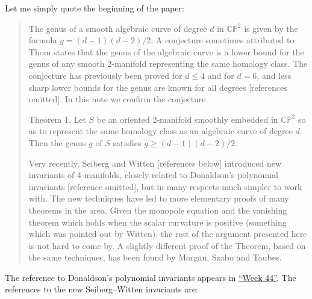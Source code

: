 \documentclass{article}
\renewcommand{\texttt}[1]{%
  \begingroup
  \ttfamily
  \begingroup\lccode`~=`/\lowercase{\endgroup\def~}{/\discretionary{}{}{}}%
  \begingroup\lccode`~=`[\lowercase{\endgroup\def~}{[\discretionary{}{}{}}%
  \begingroup\lccode`~=`.\lowercase{\endgroup\def~}{.\discretionary{}{}{}}%
  \catcode`/=\active\catcode`[=\active\catcode`.=\active
  \scantokens{#1\noexpand}%
  \endgroup
}
\begin{document}
Let me simply quote the beginning of the paper:

\begin{quote}
The genus of a smooth algebraic curve of degree \(d\) in
\(\mathbb{CP}^2\) is given by the formula \(g = (d-1)(d-2)/2\). A
conjecture sometimes attributed to Thom states that the genus of the
algebraic curve is a lower bound for the genus of any smooth 2-manifold
representing the same homology class. The conjecture has previously been
proved for \(d \leqslant 4\) and for \(d = 6\), and less sharp lower
bounds for the genus are known for all degrees {[}references omitted{]}.
In this note we confirm the conjecture.

Theorem 1. Let \(S\) be an oriented 2-manifold smoothly embedded in
\(\mathbb{CP}^2\) so as to represent the same homology class as an
algebraic curve of degree \(d\). Then the genus \(g\) of \(S\) satisfies
\(g \geqslant (d-1)(d-2)/2\).

Very recently, Seiberg and Witten {[}references below{]} introduced new
invariants of 4-manifolds, closely related to Donaldson's polynomial
invariants {[}reference omitted{]}, but in many respects much simpler to
work with. The new techniques have led to more elementary proofs of many
theorems in the area. Given the monopole equation and the vanishing
theorem which holds when the scalar curvature is positive (something
which was pointed out by Witten), the rest of the argument presented
here is not hard to come by. A slightly different proof of the Theorem,
based on the same techniques, has been found by Morgan, Szabo and
Taubes.
\end{quote}

\noindent
The reference to Donaldson's polynomial invariants appears in
\protect\hyperlink{week44}{``Week 44''}. The references to the new
Seiberg--Witten invariants are:

\end{document}
